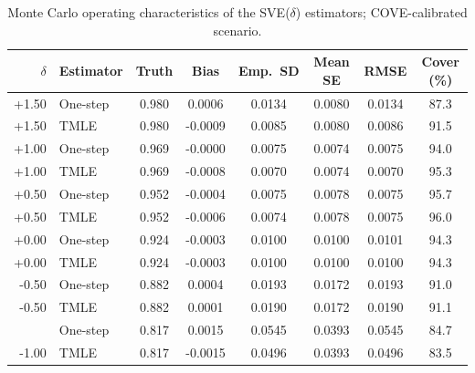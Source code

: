 \begin{table}

\caption{Monte Carlo operating characteristics of the SVE($\delta$) estimators; COVE-calibrated scenario.}
\centering
\begin{tabular}[t]{rlcccccc}
\toprule
$\delta$ & Estimator & Truth & Bias & Emp.\ SD & Mean SE & RMSE & Cover (\%)\\
\midrule
+1.50 & One-step & 0.980 & 0.0006 & 0.0134 & 0.0080 & 0.0134 & 87.3\\
+1.50 & TMLE & 0.980 & -0.0009 & 0.0085 & 0.0080 & 0.0086 & 91.5\\
+1.00 & One-step & 0.969 & -0.0000 & 0.0075 & 0.0074 & 0.0075 & 94.0\\
+1.00 & TMLE & 0.969 & -0.0008 & 0.0070 & 0.0074 & 0.0070 & 95.3\\
+0.50 & One-step & 0.952 & -0.0004 & 0.0075 & 0.0078 & 0.0075 & 95.7\\
\addlinespace
+0.50 & TMLE & 0.952 & -0.0006 & 0.0074 & 0.0078 & 0.0075 & 96.0\\
+0.00 & One-step & 0.924 & -0.0003 & 0.0100 & 0.0100 & 0.0101 & 94.3\\
+0.00 & TMLE & 0.924 & -0.0003 & 0.0100 & 0.0100 & 0.0100 & 94.3\\
-0.50 & One-step & 0.882 & 0.0004 & 0.0193 & 0.0172 & 0.0193 & 91.0\\
-0.50 & TMLE & 0.882 & 0.0001 & 0.0190 & 0.0172 & 0.0190 & 91.1\\
\addlinespace
-1.00 & One-step & 0.817 & 0.0015 & 0.0545 & 0.0393 & 0.0545 & 84.7\\
-1.00 & TMLE & 0.817 & -0.0015 & 0.0496 & 0.0393 & 0.0496 & 83.5\\
\bottomrule
\end{tabular}
\end{table}
